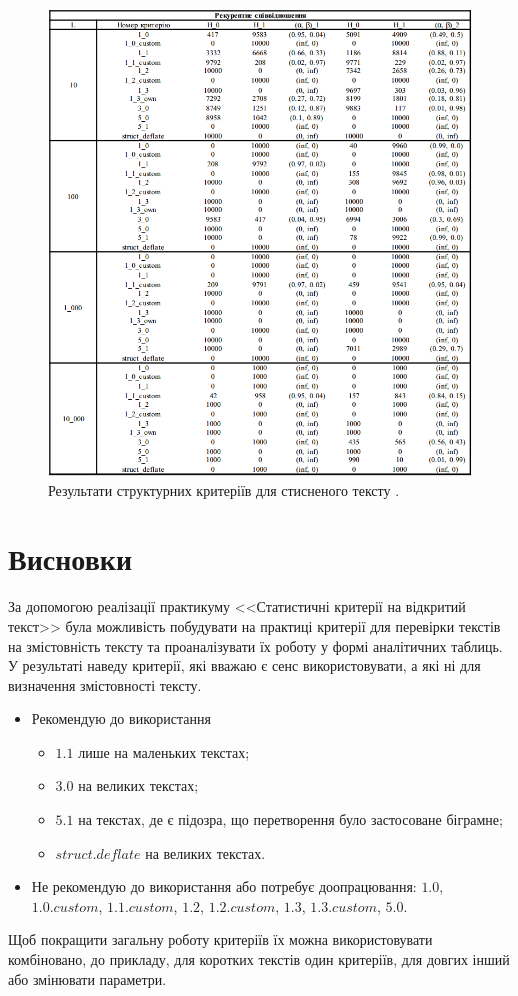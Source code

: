  \begin{figure}[!h]
    		\centering
    		\includegraphics[scale = 0.55]{Images/recurrent_relation.png}
    		\caption{Результати структурних критеріїв для стисненого тексту .}
    		\label{fig:recurrent_relation}
	\end{figure}

\section{Висновки}
За допомогою реалізації практикуму <<Статистичні критерії на відкритий текст>> була можливість побудувати на практиці критерії для перевірки текстів на змістовність тексту та проаналізувати їх роботу у формі аналітичних таблиць. У результаті наведу критерії, які вважаю є сенс використовувати, а які ні для визначення змістовності тексту. 
\begin{itemize}
    \item Рекомендую до використання
        \begin{itemize}
            \item $1.1$ лише на маленьких текстах;
            \item $3.0$ на великих текстах;
            \item $5.1$ на текстах, де є підозра, що перетворення було застосоване біграмне;
            \item $struct.deflate$ на великих текстах.
        \end{itemize} 
    
    \item Не рекомендую до використання або потребує доопрацювання: $1.0$, $1.0.custom$, $1.1.custom$, $1.2$, $1.2.custom$, $1.3$, $1.3.custom$, $5.0$.
\end{itemize}
Щоб покращити загальну роботу критеріїв їх можна використовувати комбіновано, до прикладу, для коротких текстів один критеріїв, для довгих інший або змінювати параметри. 

